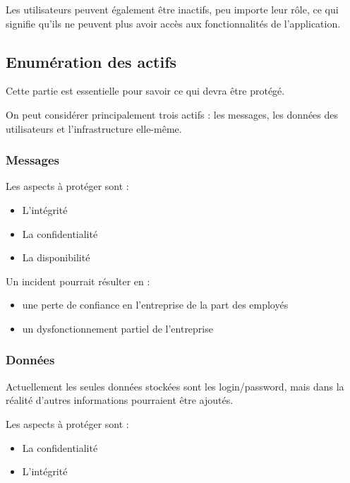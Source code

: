 \documentclass{article}
\begin{document}
Les utilisateurs peuvent également être inactifs, peu importe leur rôle,
ce qui signifie qu'ils ne peuvent plus avoir accès aux fonctionnalités
de l'application.

\hypertarget{enumuxe9ration-des-actifs}{%
\subsection{Enumération des actifs}\label{enumuxe9ration-des-actifs}}

Cette partie est essentielle pour savoir ce qui devra être protégé.

On peut considérer principalement trois actifs : les messages, les
données des utilisateurs et l'infrastructure elle-même.

\hypertarget{messages}{%
\subsubsection{Messages}\label{messages}}

Les aspects à protéger sont :

\begin{itemize}
\tightlist
\item
  L'intégrité
\item
  La confidentialité
\item
  La disponibilité
\end{itemize}

Un incident pourrait résulter en :

\begin{itemize}
\tightlist
\item
  une perte de confiance en l'entreprise de la part des employés
\item
  un dysfonctionnement partiel de l'entreprise
\end{itemize}

\hypertarget{donnuxe9es}{%
\subsubsection{Données}\label{donnuxe9es}}

Actuellement les seules données stockées sont les login/password, mais
dans la réalité d'autres informations pourraient être ajoutés.

Les aspects à protéger sont :

\begin{itemize}
\tightlist
\item
  La confidentialité
\item
  L'intégrité
\end{itemize}
\end{document}
